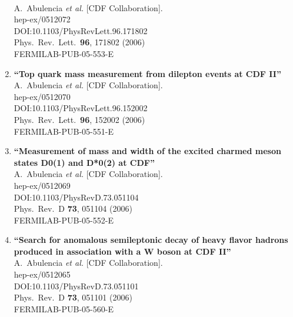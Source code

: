 \documentclass{article}
\begin{document}
\begin{enumerate}
  \\{}A.~Abulencia {\it et al.} [CDF Collaboration].
  \\{}hep-ex/0512072
  \\{}DOI:10.1103/PhysRevLett.96.171802
  \\{}Phys.\ Rev.\ Lett.\  {\bf 96}, 171802 (2006)
  \\{}FERMILAB-PUB-05-553-E
\item%
{\bf ``Top quark mass measurement from dilepton events at CDF II''}
  \\{}A.~Abulencia {\it et al.} [CDF Collaboration].
  \\{}hep-ex/0512070
  \\{}DOI:10.1103/PhysRevLett.96.152002
  \\{}Phys.\ Rev.\ Lett.\  {\bf 96}, 152002 (2006)
  \\{}FERMILAB-PUB-05-551-E
\item%
{\bf ``Measurement of mass and width of the excited charmed meson states D0(1) and D*0(2) at CDF''}
  \\{}A.~Abulencia {\it et al.} [CDF Collaboration].
  \\{}hep-ex/0512069
  \\{}DOI:10.1103/PhysRevD.73.051104
  \\{}Phys.\ Rev.\ D {\bf 73}, 051104 (2006)
  \\{}FERMILAB-PUB-05-552-E
\item%
{\bf ``Search for anomalous semileptonic decay of heavy flavor hadrons produced in association with a W boson at CDF II''}
  \\{}A.~Abulencia {\it et al.} [CDF Collaboration].
  \\{}hep-ex/0512065
  \\{}DOI:10.1103/PhysRevD.73.051101
  \\{}Phys.\ Rev.\ D {\bf 73}, 051101 (2006)
  \\{}FERMILAB-PUB-05-560-E

\end{enumerate}
\end{document}

